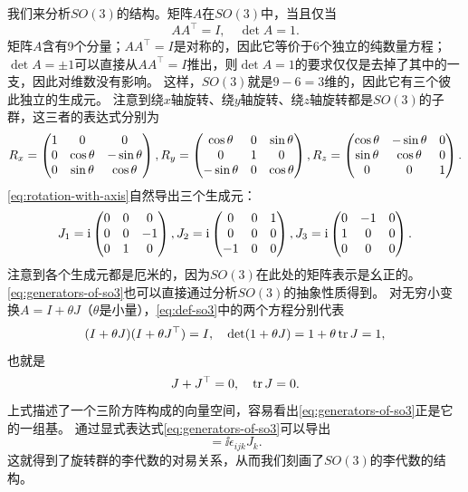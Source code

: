 我们来分析$SO(3)$的结构。矩阵$A$在$SO(3)$中，当且仅当
\begin{equation}
    A A^\top = I, \quad \det A = 1.
    \label{eq:def-so3}
\end{equation}
矩阵$A$含有9个分量；$A A^\top = I$是对称的，因此它等价于6个独立的纯数量方程；
$\det A = \pm 1$可以直接从$A A^\top=I$推出，则$\det A = 1$的要求仅仅是去掉了其中的一支，因此对维数没有影响。
这样，$SO(3)$就是$9-6=3$维的，因此它有三个彼此独立的生成元。
注意到绕$x$轴旋转、绕$y$轴旋转、绕$z$轴旋转都是$SO(3)$的子群，这三者的表达式分别为
\begin{equation}
    R_x = \pmqty{1 & 0 & 0 \\ 0 & \cos \theta & -\sin \theta \\ 0 & \sin \theta & \cos \theta}, 
    R_y = \pmqty{\cos \theta & 0 & \sin \theta \\ 0 & 1 & 0 \\ - \sin \theta & 0 & \cos \theta}, 
    R_z = \pmqty{\cos \theta & - \sin \theta & 0 \\ \sin \theta & \cos \theta & 0 \\ 0 & 0 & 1}.
    \label{eq:rotation-with-axis}
\end{equation}
\eqref{eq:rotation-with-axis}自然导出三个生成元：
\begin{equation}
    J_1 = \ii \pmqty{0 & 0 & 0 \\ 0 & 0 & -1 \\ 0 & 1 & 0}, 
    J_2 = \ii \pmqty{0 & 0 & 1 \\ 0 & 0 & 0 \\ -1 & 0 & 0}, \\
    J_3 = \ii \pmqty{0 & -1 & 0 \\ 1 & 0 & 0 \\ 0 & 0 & 0}.
    \label{eq:generators-of-so3}
\end{equation}
注意到各个生成元都是厄米的，因为$SO(3)$在此处的矩阵表示是幺正的。
\eqref{eq:generators-of-so3}也可以直接通过分析$SO(3)$的抽象性质得到。
对无穷小变换$A = I + \theta J$（$\theta$是小量），\eqref{eq:def-so3}中的两个方程分别代表
\[
    (I+\theta J) (I + \theta J^\top) = I, \quad \det (1 + \theta J) = 1 + \theta \trace J = 1,
\]
也就是
\[
    J + J^\top = 0, \quad \trace J = 0.
\]
上式描述了一个三阶方阵构成的向量空间，容易看出\eqref{eq:generators-of-so3}正是它的一组基。
通过显式表达式\eqref{eq:generators-of-so3}可以导出
\begin{equation}
    [J_i, J_j] = \ii \epsilon_{ijk} J_k.
    \label{eq:lie-algebra-so3}
\end{equation}
这就得到了旋转群的李代数的对易关系，从而我们刻画了$SO(3)$的李代数的结构。

